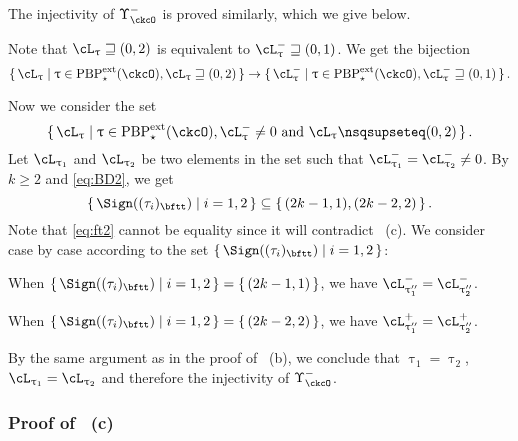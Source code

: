 \documentclass[12pt,a4paper]{amsart}
\numberwithin{equation}{section}
\theoremstyle{remark}
\def\PBPes{\mathrm{PBP}^{\mathrm{ext}}_{\star}}
\def\uptaupp{\uptau^{\prime\prime}}
\begin{document}
    \medskip

    The injectivity of $\Upsilon_{\ckcO}^{-}$ is proved similarly, which we give below.

  Note that $\ac_{\uptau}\sqsupseteq (0,2)$ is equivalent to
  $\nac{\uptau}\sqsupseteq (0,1)$.
  We get the bijection
  \[
    \set{\ac_{\uptau}|\uptau\in \PBPes(\ckcO),\ac_{\uptau}\sqsupseteq (0,2)} \rightarrow
    \set{\nac{\uptau}|\uptau\in \PBPes(\ckcO),\nac{\uptau}\sqsupseteq (0,1)}.
  \]

  Now we consider the set
 \[
  \set{\ac_{\uptau}|\uptau\in \PBPes(\ckcO),\nac{\uptau}\neq 0 \text{ and } \ac_{\uptau}\nsqsupseteq (0,2)}.
 \]
  Let $\ac_{\uptau_{1}}$ and $\ac_{\uptau_{2}}$ be two elements in the set such that
  $\nac{\uptau_{1}}=\nac{\uptau_{2}}\neq 0$.
  By $k\geq 2$ and \eqref{eq:BD2}, we get
  \begin{equation}\label{eq:ft2}
  \set{\Sign((\tau_{i})_{\bftt})| i = 1,2} \subseteq \set{ (2k-1,1),(2k-2,2)}.
  \end{equation}
  Note that \eqref{eq:ft2} cannot be equality since it will contradict ~(c).
  We consider case by case according to the set $\set{\Sign((\tau_{i})_{\bftt})|i=1,2}$:
  \begin{enumPF}
    \item When
    $\set{\Sign((\tau_{i})_{\bftt})|i=1,2} = \set{(2k-1,1)}$,
    we have $\nac{\uptau''_{1}} = \nac{\uptau''_{2}}$.
    \item When
    $\set{\Sign((\tau_{i})_{\bftt})|i=1,2} = \set{(2k-2,2)}$,
     we have
    $\pac{\uptau''_{1}} = \pac{\uptau''_{2}}$.
  \end{enumPF}
  By the same argument as in the proof of ~(b),
  we conclude that $\uptau_1 = \uptau_2$, $\ac_{ \uptau_{1} }=\ac_{ \uptau_{2} }$ and
  therefore the injectivity of $\Upsilon_{\ckcO}^{-}$.

  \subsubsection*{Proof of ~(c)}
\end{document}
